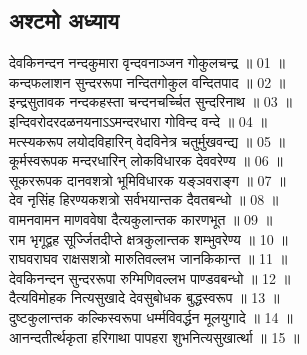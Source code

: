 \subsection{\sanskrit अश्टमो अध्याय}
\sanskrit
 देवकिनन्दन नन्दकुमारा वृन्दवनाञ्जन गोकुलचन्द्र ॥ 01 ॥\\
 कन्दफलाशन सुन्दररूपा नन्दितगोकुल वन्दितपाद ॥ 02 ॥\\
 इन्द्रसुतावक नन्दकहस्ता चन्दनचर्च्चित सुन्दरिनाथ ॥ 03 ॥\\
 इन्दिवरोदरदळनयनाऽऽमन्दरधारा गोविन्द वन्दे ॥ 04 ॥\\
 मत्स्यकरूप लयोदविहारिन् वेदविनेत्र चतुर्मुखवन्द्य ॥ 05 ॥\\
 कूर्मस्वरूपक मन्दरधारिन् लोकविधारक देववरेण्य ॥ 06 ॥\\
 सूकररूपक दानवशत्रो भूमिविधारक यङ्ञवराङ्ग ॥ 07 ॥\\
 देव नृसिंह हिरण्यकशत्रो सर्वभयान्तक दैवतबन्धो ॥ 08 ॥\\
 वामनवामन माणववेषा दैत्यकुलान्तक कारणभूत ॥ 09 ॥\\
 राम भृगूद्वह सूर्ज्जितदीप्ते क्षत्रकुलान्तक शम्भुवरेण्य ॥ 10 ॥\\
 राघवराघव राक्षसशत्रो मारुतिवल्लभ जानकिकान्त ॥ 11 ॥\\
 देवकिनन्दन सुन्दररूपा रुग्मिणिवल्लभ पाण्डवबन्धो ॥ 12 ॥\\
 दैत्यविमोहक नित्यसुखादे देवसुबोधक बुद्धस्वरूप ॥ 13 ॥\\
 दुष्टकुलान्तक कल्किस्वरूपा धर्म्मविवर्द्धन मूलयुगादे ॥ 14 ॥\\
 आनन्दतीर्त्थकृता हरिगाथा पापहरा शुभनित्यसुखार्त्था ॥ 15 ॥\\
\\
